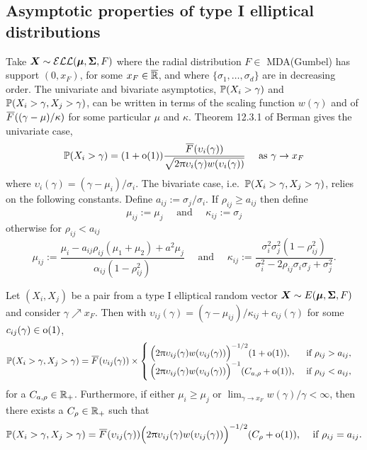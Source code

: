 \begin{subappendices}
\subsection{Asymptotic properties of type I elliptical distributions}

Take $\bm{X} \sim \mathcal{ELL}(\bm{\mu}, \bm{\Sigma}, F)$ where the radial distribution $F \in$  MDA(Gumbel) has support $(0,x_F)$, for some $x_F \in \overline{\mathbb{R}}$, and where $\{\sigma_1, \dots, \sigma_d\}$ are in decreasing order. 
The univariate and bivariate asymptotics, $\operatorname{{\mathbb P}}(X_i > \gamma)$ and $\operatorname{{\mathbb P}}(X_i > \gamma, X_j > \gamma)$, can be written in terms of the scaling function $w(\gamma)$ and of $\Ftail((\gamma-\mu)/\kappa)$ for some particular $\mu$ and $\kappa$.
Theorem 12.3.1 of Berman \cite{berman1992sojourns} gives the univariate case,
\begin{equation} \label{berman}
 \Prob(X_i > \gamma) =  (1+\oh(1)) \frac{ \Ftail(\upsilon_i(\gamma)) }
 {\sqrt{2\pi \upsilon_i(\gamma) w(\upsilon_i(\gamma)) }} \quad \text{ as } \gamma \to x_F
\end{equation}
where $\upsilon_i(\gamma) = (\gamma - \mu_i)/\sigma_i$. The bivariate case, i.e.\ $\operatorname{{\mathbb P}}(X_i > \gamma, X_j > \gamma)$, relies on the following constants. Define $a_{ij} := \sigma_j/\sigma_i$. If $\rho_{ij} \ge a_{ij}$ then define
 \[ \mu_{ij}:= \mu_j \quad \text{ and } \quad \kappa_{ij}:= \sigma_j \]
 otherwise for $\rho_{ij} < a_{ij}$
 \[ \mu_{ij}:= \frac{\mu_i-a_{ij}\rho_{ij}(\mu_1+\mu_2)+a^2\mu_j}{\alpha_{ij}(1-\rho^2_{ij})} \quad \text{ and } \quad \kappa_{ij}:= \frac{\sigma_i^2\sigma_j^2(1-\rho^2_{ij})}{ {\sigma_i^2-2\rho_{ij}\sigma_i\sigma_j + \sigma_{j}^2}}. \]

\begin{Theorem} \label{thm:type_1_asymptotics}
 Let $(X_i, X_j)$ be a pair from a type I elliptical random vector $\bm{X} \sim E(\bm{\mu}, \bm{\Sigma}, F)$ 
 and consider $\gamma \nearrow x_F$.
Then with $\upsilon_{ij}(\gamma)=(\gamma-\mu_{ij})/\kappa_{ij}+c_{ij}(\gamma)$ for some $c_{ij}(\gamma) \in {\mathrm{o}}(1)$,
 \begin{align*}
   \Prob(X_i > \gamma, X_j > \gamma)
   &= \Ftail(\upsilon_{ij}(\gamma)) \times \begin{cases}
   		 \Big( 2\pi \upsilon_{ij}(\gamma) w(\upsilon_{ij}(\gamma)) \Big)^{-1/2}(1 + \oh(1)),
   		 & \text{ if } \rho_{ij} > a_{ij}, \\%
         \Big( 2\pi \upsilon_{ij}(\gamma) w(\upsilon_{ij}(\gamma)) \Big)^{-1}(C_{a,\rho} + \oh(1)),
         & \text{ if } \rho_{ij} < a_{ij},
   	\end{cases}
 \end{align*}
 for a $C_{a,\rho} \in \mathbb{R}_+$.
Furthermore, if either $\mu_i\ge\mu_j$ or $\lim_{\gamma\to x_F}w(\gamma)/\gamma<\infty$, then there exists a $C_\rho \in \mathbb{R}_+$ such that
 \begin{align*}
   \Prob(X_i > \gamma, X_j > \gamma)
   &= \Ftail(\upsilon_{ij}(\gamma)) \Big( 2\pi \upsilon_{ij}(\gamma) w(\upsilon_{ij}(\gamma)) \Big)^{-1/2}(C_\rho + \oh(1)),
   		 & \text{ if } \rho_{ij} = a_{ij}.
 \end{align*}
\end{Theorem}


\end{subappendices}
